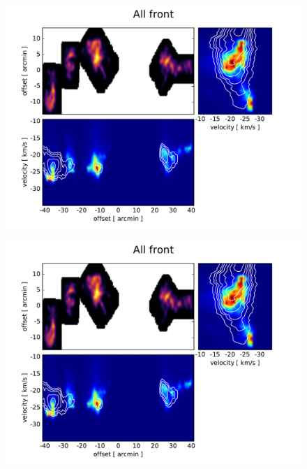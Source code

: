 \documentclass[traditabstract]{aa}
\begin{document}
\begin{figure}[h]
  \centering
  \includegraphics[page=6,width=14cm,trim=30 10 55 30,clip=true]{Figures/PV_diagrams_CO.pdf}
  \caption{}
\end{figure}

\begin{figure}[h]
  \centering
  \includegraphics[page=8,width=14cm,trim=30 10 55 30,clip=true]{Figures/PV_diagrams_CO.pdf}
  \caption{}
\end{figure}
\end{document}
